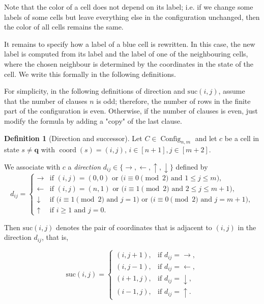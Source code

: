 \documentclass{article}
\theoremstyle{plain}
\theoremstyle{definition}
\newtheorem{definition}[theorem]{Definition}
\DeclareMathOperator{\Config}{Config}
\DeclareMathOperator{\coord}{coord}
\newcommand{\tuple}{\mathbf}
\begin{document}
Note that the color of a cell does not depend on its label; i.e. if we change  some labels of some  cells but leave everything else in the configuration unchanged, then the color of all cells remains the same.



It remains to specify how a label of a blue cell is rewritten.
In this case, the new label is computed from its label and the label of one of the neighbouring cells, where
the chosen neighbour is determined by the coordinates in the state of the cell. We write this formally in the following definitions.

For simplicity, in the following definitions of direction and $\mathrm{suc}(i,j)$, assume that the number of clauses $n$ is odd; therefore, the number of rows in the finite part of the configuration is even. Otherwise, if the number of clauses is even, just modify the formula by adding a "copy" of the last clause.

\begin{definition}[Direction and successor]\label{def:successor}
Let \( C \in \Config_{n,m} \) and let \( c \) be a cell
in state \( s \neq \tuple q \) with \( \coord(s) = (i,j) \), $i \in [n+1], j \in [m+2]$.

We associate with \( c \) a \emph{direction} 
\( d_{ij} \in \{\to,\leftarrow,\uparrow,\downarrow\} \) defined by
\[
d_{ij} =
\begin{cases}
\to 
& \text{if } (i,j) = (0,0) 
  \text{ or } \bigl(i \equiv 0 \!\!\pmod{2} \text{ and } 1 \le j \le m\bigr), \\[6pt]

\leftarrow 
& \text{if } (i,j) = (n,1) 
  \text{ or } \bigl(i \equiv 1 \!\!\pmod{2} \text{ and } 2 \le j \le m+1\bigr), \\[6pt]

\downarrow 
& \text{if } \bigl(i \equiv 1 \!\!\pmod{2} \text{ and } j=1\bigr)
  \text{ or } \bigl(i \equiv 0 \!\!\pmod{2} \text{ and } j=m+1\bigr), \\[6pt]

\uparrow 
& \text{if } i \ge 1 \text{ and } j=0.
\end{cases}
\]

Then $\mathrm{suc}(i,j)$ denotes the pair of coordinates that is
adjacent to $(i,j)$ in the direction $d_{ij}$, that is,

\[
\mathrm{suc}(i,j) =
\begin{cases}
(i, j+1), & \text{if } d_{ij} = \to, \\[6pt]
(i, j-1), & \text{if } d_{ij} = \leftarrow, \\[6pt]
(i+1, j), & \text{if } d_{ij} = \downarrow, \\[6pt]
(i-1, j), & \text{if } d_{ij} = \uparrow.
\end{cases}
\]
\end{definition}
\end{document}
